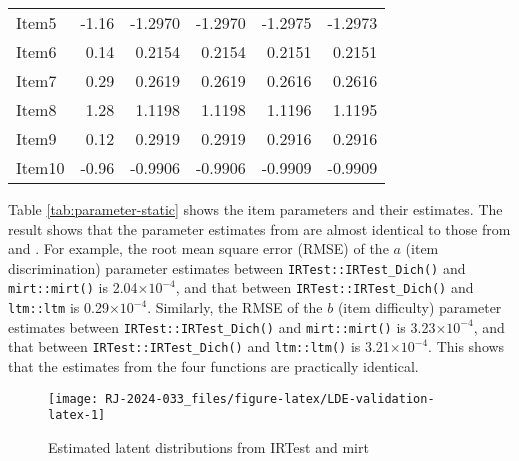 \begin{table}
\begin{tabular}[t]{lrrrrr}
\hspace{1em}Item5 & -1.16 & -1.2970 & -1.2970 & -1.2975 & -1.2973\\
\hspace{1em}Item6 & 0.14 & 0.2154 & 0.2154 & 0.2151 & 0.2151\\
\hspace{1em}Item7 & 0.29 & 0.2619 & 0.2619 & 0.2616 & 0.2616\\
\hspace{1em}Item8 & 1.28 & 1.1198 & 1.1198 & 1.1196 & 1.1195\\
\hspace{1em}Item9 & 0.12 & 0.2919 & 0.2919 & 0.2916 & 0.2916\\
\hspace{1em}Item10 & -0.96 & -0.9906 & -0.9906 & -0.9909 & -0.9909\\
\bottomrule
\end{tabular}
\end{table}

Table
\ref{tab:parameter-static}
shows the item parameters and their estimates. The result shows that the
parameter estimates from  are almost identical to those from
 and . For example, the root mean square error (RMSE)
of the \(a\) (item discrimination) parameter estimates between
\texttt{IRTest::IRTest\_Dich()} and \texttt{mirt::mirt()} is
2.04\(\times 10^{-4}\),
and that between \texttt{IRTest::IRTest\_Dich()} and \texttt{ltm::ltm} is
0.29\(\times 10^{-4}\).
Similarly, the RMSE of the \(b\) (item difficulty)
parameter estimates between \texttt{IRTest::IRTest\_Dich()} and \texttt{mirt::mirt()} is
3.23\(\times 10^{-4}\),
and that between \texttt{IRTest::IRTest\_Dich()} and \texttt{ltm::ltm()} is
3.21\(\times 10^{-4}\).
This shows that the estimates from the four functions are
practically identical.

\begin{figure}[H]

{\centering \texttt{[image: RJ-2024-033\_files/figure-latex/LDE-validation-latex-1]} 

}

\caption{Estimated latent distributions from IRTest and mirt}\label{fig:LDE-validation-latex}
\end{figure}

